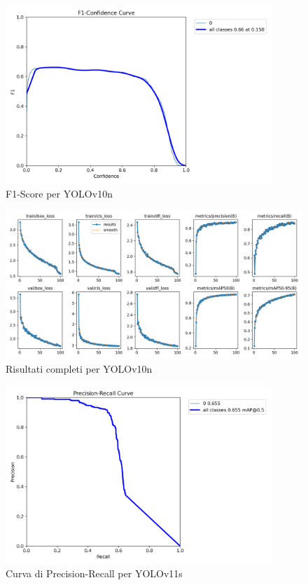 \documentclass[12pt]{article}
\begin{document}
\begin{figure}[H]
    \centering
    \includegraphics[width=0.9\textwidth]{./img/F1_curve-yolov10n.png}
    \caption{F1-Score per YOLOv10n}
    \label{fig:yolov10n-f1-score}
\end{figure}

\begin{figure}[H]
    \centering
    \includegraphics[width=1.1\textwidth]{./img/results-yolov10n.png}
    \caption{Risultati completi per YOLOv10n}
    \label{fig:yolov10n-results}
\end{figure}
\newpage
\begin{figure}[H]
    \centering
    \includegraphics[width=0.9\textwidth]{./img/PR_curve-yolov11s.png}
    \caption{Curva di Precision-Recall per YOLOv11s}
    \label{fig:yolov11s-pr-curve}
\end{figure}
\end{document}

